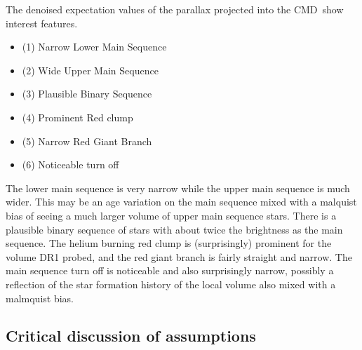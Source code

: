 \documentclass[modern]{aastex61}
\newcommand{\acronym}[1]{{\small{#1}}}
\newcommand{\cmd}{\acronym{CMD}}
\begin{document}
The denoised expectation values of the parallax projected into the \cmd\ show interest features.
\begin{itemize}
\item (1) Narrow Lower Main Sequence
\item (2) Wide Upper Main Sequence
\item (3) Plausible Binary Sequence
\item (4) Prominent Red clump
\item (5) Narrow Red Giant Branch
\item (6) Noticeable turn off
\end{itemize}
The lower main sequence is very narrow while the upper main sequence is much wider. This may be an age variation on the main sequence mixed with a malquist bias of seeing a much larger volume of upper main sequence stars. There is a plausible binary sequence of stars with about twice the brightness as the main sequence. The helium burning red clump is (surprisingly) prominent for the volume DR1 probed, and the red giant branch is fairly straight and narrow. The main sequence turn off is noticeable and also surprisingly narrow, possibly a reflection of the star formation history of the local volume also mixed with a malmquist bias.

\subsection{Critical discussion of assumptions}
\end{document}
